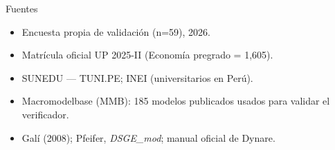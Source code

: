 \begin{frame}{Fuentes}
  \footnotesize
  \begin{itemize}
    \item Encuesta propia de validación (n=59), 2026.
    \item Matrícula oficial UP 2025-II (Economía pregrado = 1{,}605).
    \item SUNEDU — TUNI.PE; INEI (universitarios en Perú).
    \item Macromodelbase (MMB): 185 modelos publicados usados para validar el verificador.
    \item Galí (2008); Pfeifer, \emph{DSGE\_mod}; manual oficial de Dynare.
  \end{itemize}
\end{frame}
